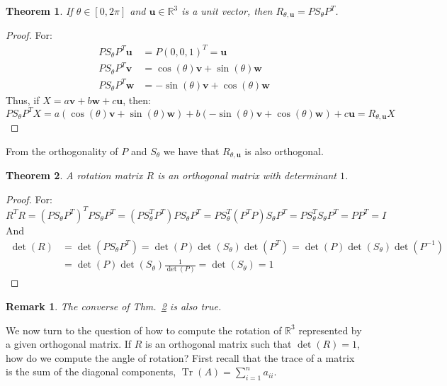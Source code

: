 \documentclass[oneside]{book}
\theoremstyle{mystyle}
\newtheorem{theorem}{Theorem}[section]
\newtheorem{remark}{Remark}[section]
\DeclareMathOperator{\Tr}{Tr}
\begin{document}
\begin{theorem}
If $\theta \in [0,2\pi]$ and $\mathbf{u}\in \mathbb{R}^3$ is a unit vector, then $R_{\theta, \mathbf{u}} = PS_{\theta}P^T$.
\end{theorem}
\begin{proof}
For:
\begin{align*}
    PS_{\theta}P^T\mathbf{u} &= P(0,0,1)^{T}=\mathbf{u}\\
    PS_{\theta}P^{T}\mathbf{v} &= \cos(\theta)\mathbf{v}+\sin(\theta) \mathbf{w}\\
    PS_{\theta}P^{T} \mathbf{w} &= -\sin(\theta) \mathbf{v}+\cos(\theta) \mathbf{w}
\end{align*}
Thus, if $X = a\mathbf{v}+b\mathbf{w}+c\mathbf{u}$, then:
\begin{equation*}
    PS_{\theta}P^TX=a(\cos(\theta)\mathbf{v}+\sin(\theta)\mathbf{w})+b(-\sin(\theta)\mathbf{v}+\cos(\theta)\mathbf{w})+c\mathbf{u}=R_{\theta,\mathbf{u}}X
\end{equation*}
\end{proof}
From the orthogonality of $P$ and $S_{\theta}$ we have that $R_{\theta,\mathbf{u}}$ is also orthogonal.
\begin{theorem}
\label{theorem:LINEAR_ALGEBRA_a_rotation_matrix_is_an_orthoganal_matrix_with_determinant_1}
A rotation matrix $R$ is an orthogonal matrix with determinant $1$.
\end{theorem}
\begin{proof}
For:
\begin{equation*}
    R^{T}R=(PS_{\theta}P^{T})^{T}PS_{\theta}P^{T}=(PS_{\theta}^{T}P^{T})PS_{\theta}P^{T}=PS_{\theta}^{T}(P^{T}P)S_{\theta}P^{T}=PS_{\theta}^{T}S_{\theta}P^{T}=PP^{T}=I
\end{equation*}
And
\begin{align*}
    \det(R) &=\det(PS_{\theta}P^T)=\det(P)\det(S_{\theta})\det(P^T)=\det(P)\det(S_{\theta})\det(P^{-1})\\
    &=\det(P)\det(S_{\theta})\tfrac{1}{\det(P)}=\det(S_{\theta})= 1
\end{align*}
\end{proof}
\begin{remark}
The converse of Thm.~\ref{theorem:LINEAR_ALGEBRA_a_rotation_matrix_is_an_orthoganal_matrix_with_determinant_1} is also true.
\end{remark}
We now turn to the question of how to compute the rotation of $\mathbb{R}^3$ represented by a given orthogonal matrix. If $R$ is an orthogonal matrix such that $\det(R) = 1$, how do we compute the angle of rotation? First recall that the trace of a matrix is the sum of the diagonal components, $\Tr(A) = \sum_{i=1}^{n}a_{ii}$.
\end{document}
